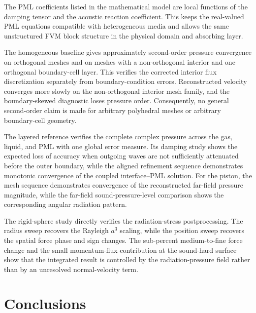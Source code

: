 \documentclass[final,12pt,nopreprintline,longtitle]{elsarticle}
\begin{document}
The PML coefficients listed in the mathematical model are local functions of
the damping tensor and the acoustic reaction coefficient.  This keeps the
real-valued PML equations compatible with heterogeneous media and allows the
same unstructured FVM block structure in the physical domain and absorbing layer.

The homogeneous baseline gives approximately second-order pressure convergence
on orthogonal meshes and on meshes with a non-orthogonal interior and one
orthogonal boundary-cell layer.  This verifies the corrected interior flux
discretization separately from boundary-condition errors.  Reconstructed
velocity converges more slowly on the non-orthogonal interior mesh family, and the
boundary-skewed diagnostic loses pressure order.  Consequently, no general
second-order claim is made for arbitrary polyhedral meshes or arbitrary
boundary-cell geometry.

The layered reference verifies the complete complex pressure across the gas,
liquid, and PML with one global error measure.  Its damping study shows the
expected loss of accuracy when outgoing waves are not sufficiently attenuated
before the outer boundary, while the aligned refinement sequence demonstrates
monotonic convergence of the coupled interface--PML solution.  For the piston,
the mesh sequence demonstrates convergence of the reconstructed far-field
pressure magnitude, while the far-field sound-pressure-level comparison shows
the corresponding angular radiation pattern.

The rigid-sphere study directly verifies the radiation-stress postprocessing.
The radius sweep recovers the Rayleigh $a^3$ scaling, while the position sweep
recovers the spatial force phase and sign changes.  The sub-percent
medium-to-fine force change and the small momentum-flux contribution at the
sound-hard surface show that the integrated result is controlled by the
radiation-pressure field rather than by an unresolved normal-velocity term.

\section{Conclusions}
\label{sec:conclusions}
\end{document}

